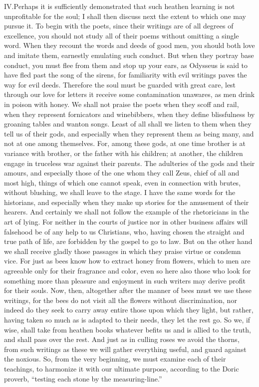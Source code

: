 \documentclass[a4paper]{article}
\begin{document}
\bigskip

\lettrine[lines=3, findent=3pt, nindent=0pt]{IV.} Perhaps it is sufficiently demonstrated that such heathen learning is not unprofitable for the soul; I shall then discuss next the extent to which one may pursue it. To begin with the poets, since their writings are of all degrees of excellence, you should not study all of their poems without omitting a single word. When they recount the words and deeds of good men, you should both love and imitate them, earnestly emulating such conduct. But when they portray base conduct, you must flee from them and stop up your ears, as Odysseus is said to have fled past the song of the sirens, for familiarity with evil writings paves the way for evil deeds. Therefore the soul must be guarded with great care, lest through our love for letters it receive some contamination unawares, as men drink in poison with honey. We shall not praise the poets when they scoff and rail, when they represent fornicators and winebibbers, when they define blissfulness by groaning tables and wanton songs. Least of all shall we listen to them when they tell us of their gods, and especially when they represent them as being many, and not at one among themselves. For, among these gods, at one time brother is at variance with brother, or the father with his children; at another, the children engage in truceless war against their parents. The adulteries of the gods and their amours, and especially those of the one whom they call Zeus, chief of all and most high, things of which one cannot speak, even in connection with brutes, without blushing, we shall leave to the stage. I have the same words for the historians, and especially when they make up stories for the amusement of their hearers. And certainly we shall not follow the example of the rhetoricians in the art of lying. For neither in the courts of justice nor in other business affairs will falsehood be of any help to us Christians, who, having chosen the straight and true path of life, are forbidden by the gospel to go to law. But on the other hand we shall receive gladly those passages in which they praise virtue or condemn vice. For just as bees know how to extract honey from flowers, which to men are agreeable only for their fragrance and color, even so here also those who look for something more than pleasure and enjoyment in such writers may derive profit for their souls. Now, then, altogether after the manner of bees must we use these writings, for the bees do not visit all the flowers without discrimination, nor indeed do they seek to carry away entire those upon which they light, but rather, having taken so much as is adapted to their needs, they let the rest go. So we, if wise, shall take from heathen books whatever befits us and is allied to the truth, and shall pass over the rest. And just as in culling roses we avoid the thorns, from such writings as these we will gather everything useful, and guard against the noxious. So, from the very beginning, we must examine each of their teachings, to harmonize it with our ultimate purpose, according to the Doric proverb, ``testing each stone by the measuring-line.''
\end{document}
